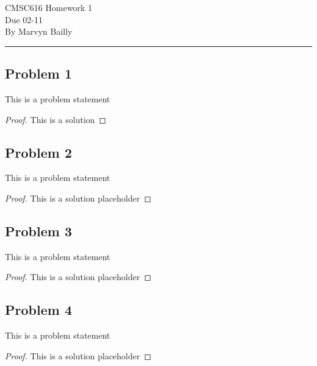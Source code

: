 \documentclass[12pt]{report}
\begin{document}
\large
\begin{center}
CMSC616 Homework 1 \\
Due 02-11 \\
By Marvyn Bailly \\
\end{center}
\normalsize
\hrule




\begin{problem}%
\subsection*{Problem 1}

This is a problem statement

\begin{proof}

This is a solution

\end{proof}
\end{problem}






\begin{problem}%
\subsection*{Problem 2}

This is a problem statement

\begin{proof}

This is a solution placeholder

\end{proof}
\end{problem}






\begin{problem}%
\subsection*{Problem 3}

This is a problem statement

\begin{proof}

This is a solution placeholder

\end{proof}
\end{problem}






\begin{problem}%
\subsection*{Problem 4}

This is a problem statement

\begin{proof}

This is a solution placeholder

\end{proof}
\end{problem}
\end{document}
